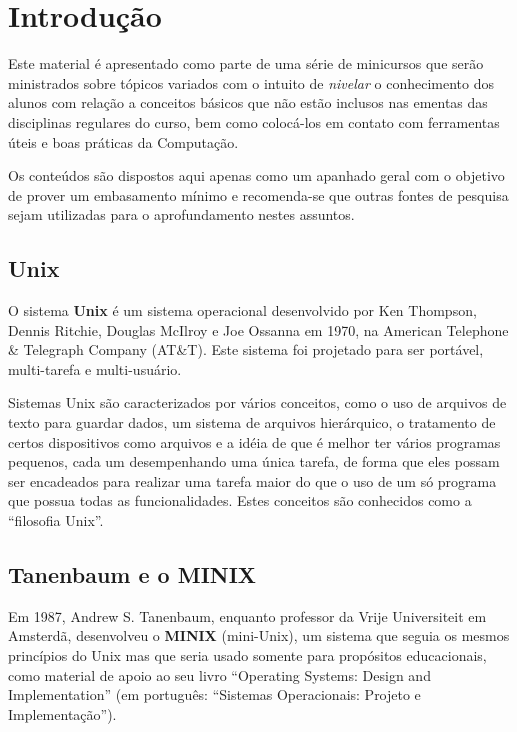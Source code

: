 \documentclass{handout_utfpr}
\begin{document}
\maketitle
\section{Introdução}

Este material é apresentado como parte de uma série de minicursos que serão ministrados sobre tópicos variados com o intuito de \textit{nivelar} o conhecimento dos alunos com relação a conceitos básicos que não estão inclusos nas ementas das disciplinas regulares do curso, bem como colocá-los em contato com ferramentas úteis e boas práticas da Computação.

Os conteúdos são dispostos aqui apenas como um apanhado geral com o objetivo de prover um embasamento mínimo e recomenda-se que outras fontes de pesquisa sejam utilizadas para o aprofundamento nestes assuntos.

\subsection{Unix}
O sistema \textbf{Unix} é um sistema operacional desenvolvido por Ken Thompson, Dennis Ritchie, Douglas McIlroy e Joe Ossanna em 1970, na American Telephone \& Telegraph Company (AT\&T). Este sistema foi projetado para ser portável, multi-tarefa e multi-usuário.

Sistemas Unix são caracterizados por vários conceitos, como o uso de arquivos de texto para guardar dados, um sistema de arquivos hierárquico, o tratamento de certos dispositivos como arquivos e a idéia de que é melhor ter vários programas pequenos, cada um desempenhando uma única tarefa, de forma que eles possam ser encadeados para realizar uma tarefa maior do que o uso de um só programa que possua todas as funcionalidades. Estes conceitos são conhecidos como a ``filosofia Unix''.

\subsection{Tanenbaum e o MINIX}
Em 1987, Andrew S. Tanenbaum, enquanto professor da Vrije Universiteit em Amsterdã, desenvolveu o \textbf{MINIX} (mini-Unix), um sistema que seguia os mesmos princípios do Unix mas que seria usado somente para propósitos educacionais, como material de apoio ao seu livro ``Operating Systems: Design and Implementation'' (em português: ``Sistemas Operacionais: Projeto e Implementação'').
\end{document}
